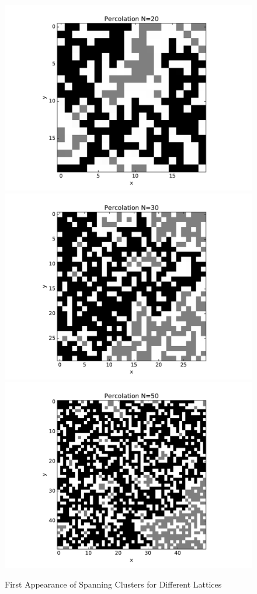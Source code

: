 \documentclass[12pt]{article}
\begin{document}
\begin{figure}[H]
  \label{delta02}
\endminipage\hfill
{}
  \includegraphics[width=\linewidth]{percolation_20.pdf}
  \label{delta02}
\endminipage\hfill
{}
  \includegraphics[width=\linewidth]{percolation_30.pdf}
  \label{delta02}
\endminipage\hfill
{}
  \includegraphics[width=\linewidth]{percolation_50.pdf}
  \label{delta02}
\endminipage\hfill
  \caption{First Appearance of Spanning Clusters for Different Lattices}
\end{figure}
\end{document}
